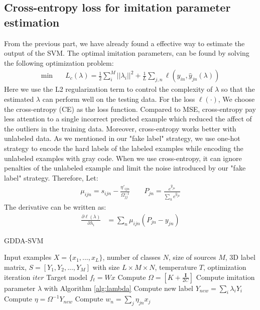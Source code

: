 \subsection{Cross-entropy loss for imitation parameter estimation}
From the previous part, we have already found a effective way to estimate the output of the SVM. The optimal imitation parameters, can be found by solving the following optimization problem:
\begin{equation}\label{eq:loo_loss}
\begin{aligned}
\min \quad& L_c\left(\lambda\right)=\frac{1}{2}\sum_i^M||\lambda_i||^2+\frac{1}{L}\sum_{j,n}\ell\left(y_{in},\hat{y}_{jn}\left(\lambda\right)\right)
\end{aligned}
\end{equation}
Here we use the L2 regularization term to control the complexity of $\lambda$ so that the estimated $\lambda$ can perform well on the testing data. For the loss $\ell(\cdot)$, We choose the cross-entropy (CE) as the loss function.
Compared to MSE, cross-entropy pay less attention to a single incorrect predicted example which reduced the affect of the outliers in the training data. Moreover, cross-entropy works better with unlabeled data. As we mentioned in our "fake label" strategy, we use one-hot strategy to encode the hard labels of the labeled examples while encoding the unlabeled examples with gray code. When we use cross-entropy, it can ignore penalties of the unlabeled example and limit the noise introduced by our "fake label" strategy. Therefore, 
Let:
\begin{equation}\label{eq:mu}
\begin{aligned}
\mu_{ijn}=s_{ijn}-\frac{{\eta}'_{ijn}}{\Omega_{jj}^{-1}} \qquad
P_{jn} = \frac{e^{\hat{y}_{jn}}}{\sum_{h} e^{\hat{y}_{jh}}}
\end{aligned}
\end{equation}
The derivative can be written as:
\begin{equation}\label{eq:p}
\begin{aligned}
\frac{\partial \ell(\lambda)}{\partial \lambda_i}&=\sum_n\mu_{ijn}\left(P_{jn}-{y}_{jn}\right)
\end{aligned}
\end{equation}
\begin{algorithm}[t]
	\caption{GDDA-SVM}\label{alg:svm}
	\begin{algorithmic}
		\Require Input examples $X=\{x_1,...,x_L\}$, number of classes $N$, size of sources $M$, 3D label matrix, $S=[Y_1,Y_2,...,Y_{M}]$ with size $L\times M \times N$, temperature $T$, optimization iteration $iter$
		\Ensure Target model $f_t = Wx$
		\State Compute $\Omega=[K+\frac{\mathbf{I}}{2C}]$
		\State Compute imitation parameter $\lambda$ with Algorithm \ref{alg:lambda}
		\State Compute new label $Y_{new}=\sum_i\lambda_iY_i$
		\State Compute $\eta = \Omega^{-1}Y_{new}$
		\State Compute $w_n = \sum_j \eta_{jn}x_j$
	\end{algorithmic}	
\end{algorithm}
